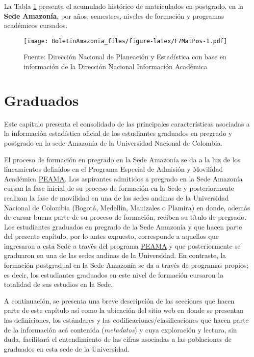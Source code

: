 \documentclass[
]{book}
\begin{document}
La Tabla \ref{fig:F7MatPos} presenta el acumulado histórico de matriculados en postgrado, en la \textbf{Sede Amazonía}, por años, semestres, niveles de formación y programas académicos cursados.

\begin{figure}
\centering
\texttt{[image: BoletinAmazonia\_files/figure-latex/F7MatPos-1.pdf]}
\caption{\label{fig:F7MatPos}Fuente: Dirección Nacional de Planeación y Estadística con base en información de la Dirección Nacional Información Académica}
\end{figure}

\hypertarget{Grad}{%
\chapter{Graduados}\label{Grad}}

Este capítulo presenta el consolidado de las principales características asociadas a la información estadística oficial de los estudiantes graduados en pregrado y postgrado en la sede Amazonía de la Universidad Nacional de Colombia.

El proceso de formación en pregrado en la Sede Amazonía se da a la luz de los lineamientos definidos en el Programa Especial de Admisión y Movilidad Académica \protect\hyperlink{peama}{PEAMA}. Los aspirantes admitidos a pregrado en la Sede Amazonía cursan la fase inicial de su proceso de formación en la Sede y posteriormente realizan la fase de movilidad en una de las sedes andinas de la Universidad Nacional de Colombia (Bogotá, Medellín, Manizales o Plamira) en donde, además de cursar buena parte de su proceso de formación, reciben su título de pregrado. Los estudiantes graduados en pregrado de la Sede Amazonía y que hacen parte del presente capítulo, por lo antes expuesto, corresponde a aquellos que ingresaron a esta Sede a través del programa \protect\hyperlink{peama}{PEAMA} y que posteriormente se graduaron en una de las sedes andinas de la Universidad. En contraste, la formación postgradual en la Sede Amazonía se da a través de programas propios; es decir, los estudiantes graduados en este nivel de formación cursaron la totalidad de sus estudios en la Sede.

A continuación, se presenta una breve descripción de las secciones que hacen parte de este capítulo así como la ubicación del sitio web en donde se presentan las definiciones, los estándares y las codificaciones/clasificaciones que hacen parte de la información acá contenida (\emph{metadatos}) y cuya exploración y lectura, sin duda, facilitará el entendimiento de las cifras asociadas a las poblaciones de graduados en esta sede de la Universidad.
\end{document}
